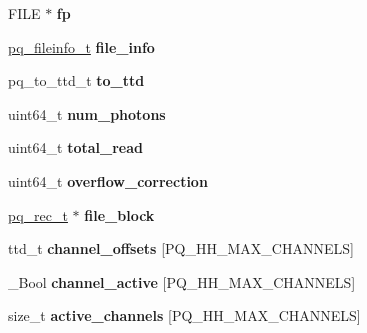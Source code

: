 \begin{DoxyCompactItemize}
\item 
\hypertarget{structpq__fb__t_a56ca6a3a568c3face4b2b1d87e3c1cc3}{}F\+I\+L\+E $\ast$ {\bfseries fp}\label{structpq__fb__t_a56ca6a3a568c3face4b2b1d87e3c1cc3}

\item 
\hypertarget{structpq__fb__t_a618229e4e31b0c89341e78df7df45f85}{}\hyperlink{structpq__fileinfo__t}{pq\+\_\+fileinfo\+\_\+t} {\bfseries file\+\_\+info}\label{structpq__fb__t_a618229e4e31b0c89341e78df7df45f85}

\item 
\hypertarget{structpq__fb__t_a8c0fa0e2d4865cd3ed322d4699717d59}{}pq\+\_\+to\+\_\+ttd\+\_\+t {\bfseries to\+\_\+ttd}\label{structpq__fb__t_a8c0fa0e2d4865cd3ed322d4699717d59}

\item 
\hypertarget{structpq__fb__t_af2b955d5071aa67cf749e8503cda972e}{}uint64\+\_\+t {\bfseries num\+\_\+photons}\label{structpq__fb__t_af2b955d5071aa67cf749e8503cda972e}

\item 
\hypertarget{structpq__fb__t_aefb940283eb58b0f9e0792896885f06a}{}uint64\+\_\+t {\bfseries total\+\_\+read}\label{structpq__fb__t_aefb940283eb58b0f9e0792896885f06a}

\item 
\hypertarget{structpq__fb__t_a84da10eda170bf3c02ba1f25f68bc746}{}uint64\+\_\+t {\bfseries overflow\+\_\+correction}\label{structpq__fb__t_a84da10eda170bf3c02ba1f25f68bc746}

\item 
\hypertarget{structpq__fb__t_ad45813e118b9fb7005fa6c1366c3024e}{}\hyperlink{unionpq__rec__t}{pq\+\_\+rec\+\_\+t} $\ast$ {\bfseries file\+\_\+block}\label{structpq__fb__t_ad45813e118b9fb7005fa6c1366c3024e}

\item 
\hypertarget{structpq__fb__t_a17fcb11f11f7816fb6ac936b9e3aead9}{}ttd\+\_\+t {\bfseries channel\+\_\+offsets} \mbox{[}P\+Q\+\_\+\+H\+H\+\_\+\+M\+A\+X\+\_\+\+C\+H\+A\+N\+N\+E\+L\+S\mbox{]}\label{structpq__fb__t_a17fcb11f11f7816fb6ac936b9e3aead9}

\item 
\hypertarget{structpq__fb__t_a6164c1dd3161f99554fb289e2956c0d0}{}\+\_\+\+Bool {\bfseries channel\+\_\+active} \mbox{[}P\+Q\+\_\+\+H\+H\+\_\+\+M\+A\+X\+\_\+\+C\+H\+A\+N\+N\+E\+L\+S\mbox{]}\label{structpq__fb__t_a6164c1dd3161f99554fb289e2956c0d0}

\item 
\hypertarget{structpq__fb__t_ad563a0cec93bb7277c5461deca1d2fdc}{}size\+\_\+t {\bfseries active\+\_\+channels} \mbox{[}P\+Q\+\_\+\+H\+H\+\_\+\+M\+A\+X\+\_\+\+C\+H\+A\+N\+N\+E\+L\+S\mbox{]}\label{structpq__fb__t_ad563a0cec93bb7277c5461deca1d2fdc}


\end{DoxyCompactItemize}

